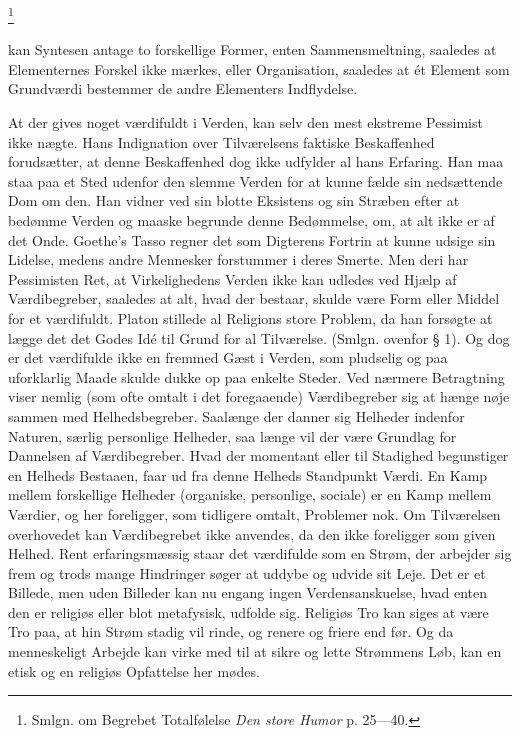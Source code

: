 \documentclass[12pt]{article}
\newcommand{\apage}[1]{\marginnote{\footnotesize\textit{[#1]}}}
\begin{document}
         \footnote{Smlgn. om Begrebet Totalfølelse \textit{Den store Humor} p.
25---40.}

       kan Syntesen antage to forskellige Former, enten Sammensmeltning,
saaledes at Elementernes Forskel ikke mærkes, eller Organisation, saaledes at
ét Element som Grundværdi bestemmer de andre Elementers Indflydelse.

At der gives noget værdifuldt i Verden, kan selv den mest ekstreme Pessimist
ikke nægte. Hans Indignation over Tilværelsens faktiske Beskaffenhed
forudsætter, at denne Beskaffenhed dog ikke udfylder al hans Erfaring. Han maa
staa paa et Sted udenfor den slemme Verden
\setcounter{footnote}{0}%
\apage{102}for at kunne fælde sin nedsættende Dom om den. Han vidner ved sin
blotte Eksistens og sin Stræben efter at bedømme Verden og maaske begrunde
denne Bedømmelse, om, at alt ikke er af det Onde. Goethe's Tasso regner det som
Digterens Fortrin at kunne udsige sin Lidelse, medens andre Mennesker
forstummer i deres Smerte. Men deri har Pessimisten Ret, at Virkelighedens
Verden ikke kan udledes ved Hjælp af Værdibegreber, saaledes at alt, hvad der
bestaar, skulde være Form eller Middel for et værdifuldt. Platon stillede al
Religions store Problem, da han forsøgte at lægge det \guillemotright{}det
Godes Idé\guillemotleft{} til Grund for al Tilværelse. (Smlgn. ovenfor § 1). Og
dog er det værdifulde ikke en fremmed Gæst i Verden, som pludselig og paa
uforklarlig Maade skulde dukke op paa enkelte Steder. Ved nærmere Betragtning
viser nemlig (som ofte omtalt i det foregaaende) Værdibegreber sig at hænge
nøje sammen med Helhedsbegreber. Saalænge der danner sig Helheder indenfor
Naturen, særlig personlige Helheder, saa længe vil der være Grundlag for
Dannelsen af Værdibegreber. Hvad der momentant eller til Stadighed begunstiger
en Helheds Bestaaen, faar ud fra denne Helheds Standpunkt Værdi. En Kamp mellem
forskellige Helheder (organiske, personlige, sociale) er en Kamp mellem
Værdier, og her foreligger, som tidligere omtalt, Problemer nok. Om Tilværelsen
overhovedet kan Værdibegrebet ikke anvendes, da den ikke foreligger som given
Helhed. Rent erfaringsmæssig staar det værdifulde som en Strøm, der arbejder
sig frem og trods mange Hindringer søger at uddybe og udvide sit Leje. Det er
et Billede, men uden Billeder kan nu engang ingen Verdensanskuelse, hvad enten
den er religiøs eller blot metafysisk, udfolde sig. Religiøs Tro kan siges at
være Tro paa, at hin Strøm stadig vil rinde, og renere og friere
\setcounter{footnote}{0}%
\apage{103}end før. Og da menneskeligt Arbejde kan virke med til at sikre og
lette Strømmens Løb, kan en etisk og en religiøs Opfattelse her mødes.
\end{document}

